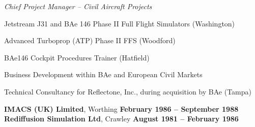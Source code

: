 \documentclass[10pt]{article}
\newenvironment{outerlist}[1][\enskip\textbullet]%
        {\begin{itemize}[#1]}{\end{itemize}%
         \vspace{-.6\baselineskip}}
\newenvironment{innerlist}[1][\enskip\textbullet]%
        {\begin{compactitem}[#1]}{\end{compactitem}}
\newcommand{\blankline}{\quad\pagebreak[2]}
\begin{document}
\begin{innerlist}

\item[] \textit{Chief Project Manager -- Civil Aircraft Projects}%
\begin{innerlist}
\item Jetstream J31 and BAe 146 Phase II Full Flight Simulators (Washington)
\item Advanced Turboprop (ATP) Phase II FFS (Woodford)
\item BAe146 Cockpit Procedures Trainer (Hatfield)
\item Business Development within BAe and European Civil Markets
\item Technical Consultancy for Reflectone, Inc., during acquisition by BAe (Tampa)

\end{innerlist}

\end{innerlist}

\blankline

%
%
%
%
%
%
%

\textbf{IMACS (UK) Limited}, Worthing        \hfill \textbf{February 1986 -- September 1988}
\textbf{Rediffusion Simulation Ltd}, Crawley        \hfill \textbf{August 1981 -- February 1986}
\end{document}

